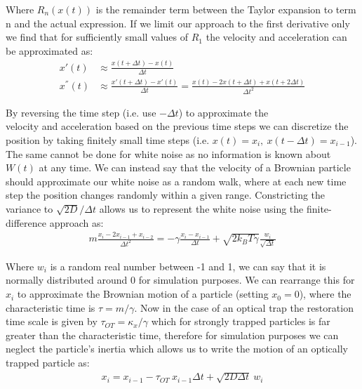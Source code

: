 Where $R_n(x(t))$ is the remainder term between the Taylor expansion to 
term n and the actual expression. If we limit our approach to the first 
derivative only we find that for sufficiently small values of $R_1$ the 
velocity and acceleration can be approximated as:
\begin{align}
	x'(t) &\approx \frac{x(t+\Delta t)-x(t)}{\Delta t}
	\\
	x^{''}(t) &\approx \frac{x'(t+\Delta t)-x'(t)}{\Delta t} = \frac{x(t)-2x(t+\Delta t)+x(t+2\Delta t)}{\Delta t^2}
\end{align}

By reversing the time step (i.e. use $-\Delta t$) to approximate the \\
velocity and acceleration based on the previous time steps we can 
discretize the position by taking finitely small  time steps (i.e. 
$x(t) = x_i,\ x(t-\Delta t) = x_{i-1}$). The same cannot be done for 
white noise as no information is known about $W(t)$ at any time. We 
can instead say that the velocity of a Brownian particle should 
approximate our white noise as a random walk, where at each new time 
step the position changes randomly within a given range. Constricting 
the variance to $\sqrt{2D}/\Delta t$ allows us to represent the white 
noise using the finite-difference approach as:
\begin{align}
	m\frac{x_i-2x_{i-1}+x_{i-2}}{\Delta t^2} = -\gamma\frac{x_i-x_{i-1}}{\Delta t}+\sqrt{2k_BT\gamma}\frac{w_i}{\sqrt{\Delta t}}
\end{align}

Where $w_i$ is a random real number between -1 and 1, we can say that 
it is normally distributed around 0 for simulation purposes. We can 
rearrange this for $x_i$ to approximate the Brownian motion of a 
particle (setting $x_0=0$), where the characteristic time is $\tau = m/\gamma$. 
Now in the case of an optical trap the restoration time scale is 
given by $\tau_{OT}=\kappa_x/\gamma$ which for strongly trapped particles 
is far greater than the characteristic time, therefore for simulation 
purposes we can neglect the particle's inertia which allows us to 
write the motion of an optically trapped particle as:
\begin{align}
	\label{eq:sim_langevin}
	x_i = x_{i-1} - \tau_{OT}\ x_{i-1}\Delta t + \sqrt{2D\Delta t}\ w_i
\end{align} 

